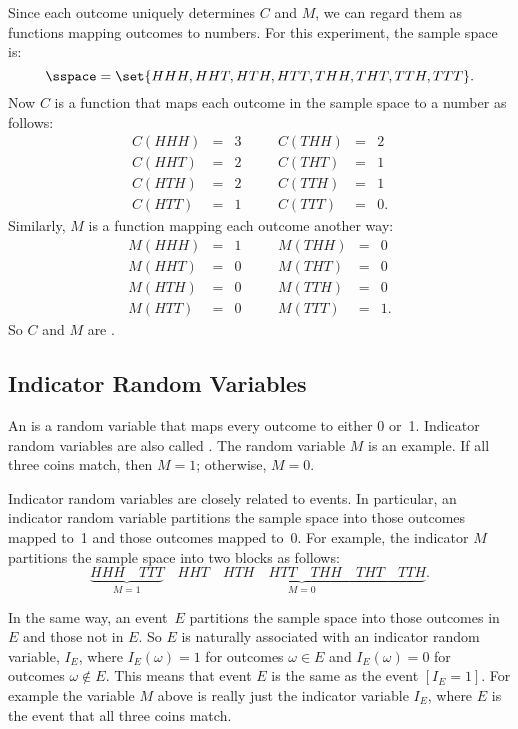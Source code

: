Since each outcome uniquely determines $C$ and $M$, we can regard them
as functions mapping outcomes to numbers.  For this experiment, the
sample space is:
\[
\sspace  =  \set{ HHH, HHT, HTH, HTT, THH, THT, TTH, TTT }.
\]
Now $C$ is a function that maps each outcome in the sample space to a 
number as follows:
\[
\begin{array}{rclcrcl}
C(HHH) & = & 3 & \quad & C(THH) & = & 2 \\
C(HHT) & = & 2 & \quad & C(THT) & = & 1 \\
C(HTH) & = & 2 & \quad & C(TTH) & = & 1 \\
C(HTT) & = & 1 & \quad & C(TTT) & = & 0.
\end{array}
\]
Similarly, $M$ is a function mapping each outcome another way:
\[
\begin{array}{rclcrcl}
M(HHH) & = & 1 & \quad & M(THH) & = & 0 \\
M(HHT) & = & 0 & \quad & M(THT) & = & 0 \\
M(HTH) & = & 0 & \quad & M(TTH) & = & 0 \\
M(HTT) & = & 0 & \quad & M(TTT) & = & 1.
\end{array}
\]
So $C$ and $M$ are .

\subsection{Indicator Random Variables}

An  is a random variable that maps
every outcome to either 0 or~1.  Indicator random variables are also
called .  The random variable $M$ is an
example.  If all three coins match, then $M=1$; otherwise, $M = 0$.

Indicator random variables are closely related to events.  In
particular, an indicator random variable partitions the sample space
into those outcomes mapped to~1 and those outcomes mapped to~0.  For
example, the indicator $M$ partitions the sample space into two blocks
as follows:
\[
\underbrace{HHH \quad TTT}_{\text{$M = 1$}} \quad
\underbrace{HHT \quad HTH \quad HTT \quad
        THH \quad THT \quad TTH}_{\text{$M = 0$}}.
\]

In the same way, an event~$E$ partitions the sample space into those
outcomes in $E$ and those not in $E$.  So $E$ is naturally associated
with an indicator random variable,  $I_E$, where $I_E(\omega) = 1$ for outcomes $\omega \in E$ and
$I_E(\omega) = 0$ for outcomes $\omega \notin E$.  This means that
event $E$ is the same as the event $[I_E = 1]$.  For example the
variable $M$ above is really just the indicator variable $I_E$, where
$E$ is the event that all three coins match.

